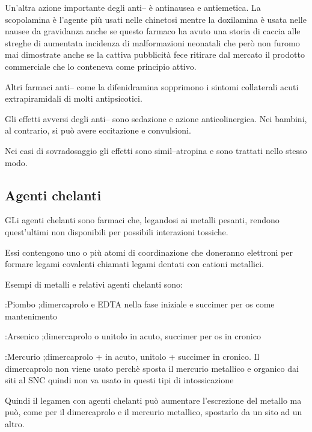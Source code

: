 Un'altra azione importante degli anti-- è antinausea e antiemetica. La scopolamina è l'agente più usati nelle chinetosi mentre la doxilamina è usata nelle nausee da gravidanza anche se questo farmaco ha avuto una storia di caccia alle streghe di aumentata incidenza di malformazioni neonatali che però non furomo mai dimostrate anche se la cattiva pubblicità fece ritirare dal mercato il prodotto commerciale che lo conteneva come principio attivo.

Altri farmaci anti-- come la difenidramina sopprimono i sintomi collaterali acuti extrapiramidali di molti antipsicotici.

Gli effetti avversi degli anti-- sono sedazione e azione anticolinergica. Nei bambini, al contrario, si può avere eccitazione e convulsioni.

Nei casi di sovradosaggio gli effetti sono simil--atropina e sono trattati nello stesso modo.

\subsection{Agenti chelanti}

GLi agenti chelanti sono farmaci che, legandosi ai metalli pesanti, rendono quest'ultimi non disponibili per possibili interazioni tossiche.

Essi contengono uno o più atomi di coordinazione che doneranno elettroni per formare legami covalenti chiamati legami dentati con cationi metallici.

Esempi di metalli e relativi agenti chelanti sono:

:Piombo
;dimercaprolo e EDTA nella fase iniziale e succimer per os come mantenimento

:Arsenico
;dimercaprolo o unitolo in acuto, succimer per os in cronico

:Mercurio
;dimercaprolo +  in acuto, unitolo + succimer in cronico. Il dimercaprolo non viene usato perchè sposta il mercurio metallico e organico dai siti al SNC quindi non va usato in questi tipi di intossicazione

Quindi il legamen  con agenti chelanti può aumentare l'escrezione del metallo ma può, come per il dimercaprolo e il mercurio metallico, spostarlo da un sito ad un altro.

